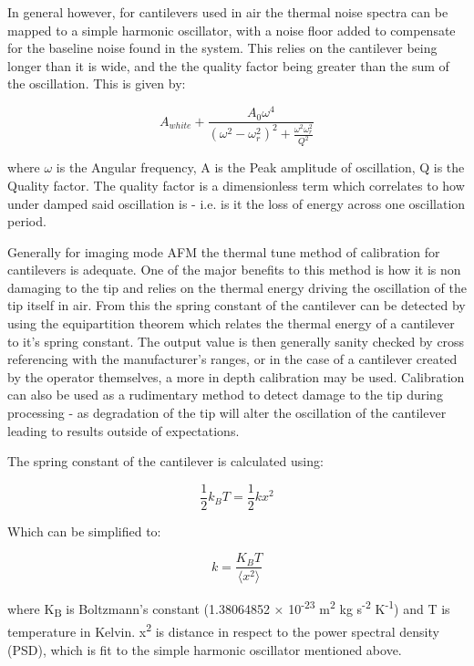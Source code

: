 In general however, for cantilevers used in air the thermal noise spectra can be mapped to a simple harmonic oscillator, with a noise floor added to compensate for the baseline noise found in the system. This relies on the cantilever being longer than it is wide, and the the quality factor being greater than the sum of the oscillation. This is given by:

\begin{equation}
A_{white} + \frac{A_0 \omega^4}{(\omega^2 - \omega^2_r)^2 + \frac{\omega^2 \omega^2_r}{Q^2}}
\end{equation}

where $\omega$ is the Angular frequency, A is the Peak amplitude of oscillation, Q is the Quality factor. The quality factor is a dimensionless term which correlates to how under damped said oscillation is - i.e. is it the loss of energy across one oscillation period. 

Generally for imaging mode AFM the thermal tune method of calibration for cantilevers is adequate. One of the major benefits to this method is how it is non damaging to the tip and relies on the thermal energy driving the oscillation of the tip itself in air. From this the spring constant of the cantilever can be detected by using the equipartition theorem which relates the thermal energy of a cantilever to it's spring constant. The output value is then generally sanity checked by cross referencing with the manufacturer's ranges, or in the case of a cantilever created by the operator themselves, a more in depth calibration may be used. Calibration can also be used as a rudimentary method to detect damage to the tip during processing - as degradation of the tip will alter the oscillation of the cantilever leading to results outside of expectations. 

The spring constant of the cantilever is calculated using:

\begin{equation}
\frac{1}{2}k_{B}T = \frac{1}{2}kx^{2}
\end{equation}

Which can be simplified to:

\begin{equation}
k = \frac{K_{B}T}{\langle x^{2} \rangle}
\end{equation}

where K\textsubscript{B} is Boltzmann's constant (1.38064852 × 10\textsuperscript{-23} m\textsuperscript{2} kg s\textsuperscript{-2} K\textsuperscript{-1}) and T is temperature in Kelvin. x\textsuperscript{2} is distance in respect to the power spectral density (PSD), which is fit to the simple harmonic oscillator mentioned above. \cite{ThermalCalc, JankThesis}

